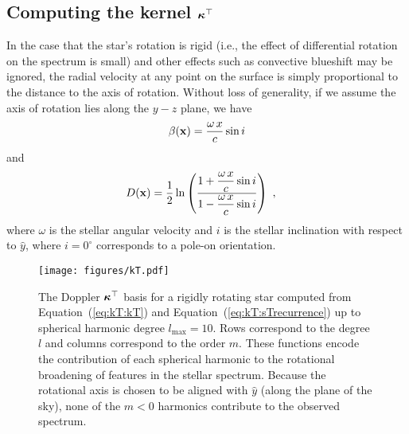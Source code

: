 \documentclass[modern]{aastex631}
\begin{document}
\subsection{Computing the kernel $\boldsymbol{\kappa}^\top$}
\label{sec:kT}
%
In the case that the star's rotation is rigid (i.e., the effect of differential rotation on the spectrum is small) and other effects such as convective blueshift may be ignored, the radial velocity at any point on the surface is simply proportional to the distance to the axis of rotation. 
Without loss of generality, if we assume the axis of rotation lies along the $y-z$ plane, we have
%
\begin{align}
    \label{eq:kT:beta}
    \beta({\mathbf{x}}) = \frac{\omega \, x}{c} \sin i
\end{align}
%
and
%
\begin{align}
    \label{eq:kT:D}
    D({\mathbf{x}}) & =
    \frac{1}{2}\ln\left(
    \dfrac{1 + \dfrac{\omega \, x}{c} \sin i}
    {1 - \dfrac{\omega \, x}{c} \sin i}
    \right)
    \hskip 0.33em ,
\end{align}
%
where $\omega$ is the stellar angular velocity and $i$ is the stellar inclination with respect to $\hat{y}$, where $i = 0^\circ$ corresponds to a pole-on orientation.

\begin{figure}[t!]
    \begin{centering}
        \texttt{[image: figures/kT.pdf]}
        \caption{%
            The Doppler $\boldsymbol{\kappa}^\top$ basis for a rigidly rotating star computed from Equation~(\ref{eq:kT:kT}) and Equation~(\ref{eq:kT:sTrecurrence}) up to spherical harmonic degree $l_\mathrm{max}=10$. 
            Rows correspond to the degree $l$ and columns correspond to the order $m$. 
            These functions encode the contribution of each spherical harmonic to the rotational broadening of features in the stellar spectrum. 
            Because the rotational axis is chosen to be aligned with $\hat{y}$ (along the plane of the sky), none of the $m < 0$ harmonics contribute to the observed spectrum.
        }
        \label{fig:kT}
    \end{centering}
\end{figure}
\end{document}
